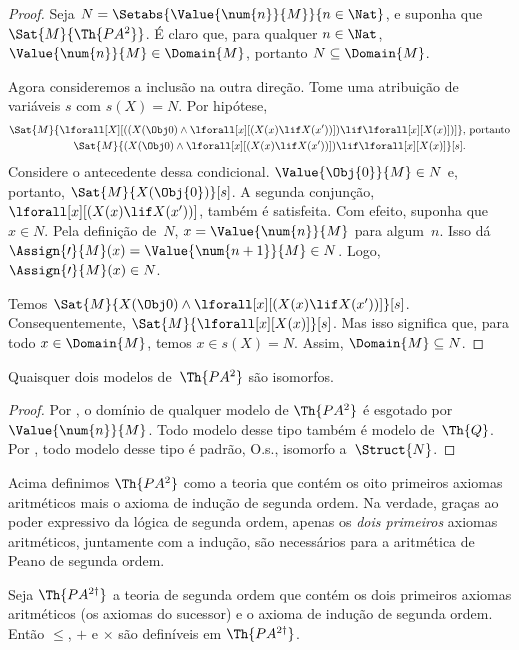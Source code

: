 \documentclass[../../../include/open-logic-section]{subfiles}
\begin{document}
\begin{proof}
Seja $N = \Setabs{\Value{\num{n}}{M}}{n \in \Nat}$, e suponha que
$\Sat{M}{\Th{PA^2}}$. É claro que, para qualquer $n \in \Nat$,
$\Value{\num{n}}{M} \in \Domain{M}$, portanto $N \subseteq \Domain{M}$.

Agora consideremos a inclusão na outra direção. Tome uma atribuição de
variáveis $s$ com $s(X) = N$. Por hipótese,
\begin{align*}
\Sat{M}{\lforall[X][((X(\Obj 0) \land \lforall[x][(X(x)
      \lif X(x'))]) \lif \lforall[x][X(x)])]}, & \text{ portanto}\\
\Sat{M}{(X(\Obj 0) \land \lforall[x][(X(x) \lif X(x'))]) \lif
  \lforall[x][X(x)]}[s]. & 
\end{align*}
Considere o antecedente dessa condicional. $\Value{\Obj{0}}{M} \in N$ e,
portanto, $\Sat{M}{X(\Obj{0})}[s]$. A segunda conjunção,
$\lforall[x][(X(x) \lif X(x'))]$, também é satisfeita. Com efeito, suponha
que $x \in N$. Pela definição de~$N$, $x = \Value{\num{n}}{M}$ para
algum~$n$. Isso dá $\Assign{\prime}{M}(x) = \Value{\num{n+1}}{M} \in N$.
Logo, $\Assign{\prime}{M}(x) \in N$.

Temos $\Sat{M}{X(\Obj 0) \land \lforall[x][(X(x) \lif X(x'))]}[s]$.
Consequentemente, $\Sat{M}{\lforall[x][X(x)]}[s]$. Mas isso significa que,
para todo $x \in \Domain{M}$, temos $x \in s(X) = N$. Assim,
$\Domain{M} \subseteq N$.
\end{proof}

\begin{cor}
Quaisquer dois modelos de~$\Th{PA^2}$ são isomorfos.
\end{cor}

\begin{proof}
Por , o domínio de qualquer modelo de
$\Th{PA^2}$ é esgotado por $\Value{\num{n}}{M}$. Todo modelo desse tipo
também é modelo de~$\Th{Q}$. Por
, todo modelo desse tipo é padrão,
O.s.\@, isomorfo a~$\Struct{N}$.
\end{proof}

Acima definimos $\Th{PA^2}$ como a teoria que contém os oito primeiros
axiomas aritméticos mais o axioma de indução de segunda ordem. Na verdade,
graças ao poder expressivo da lógica de segunda ordem, apenas os
\emph{dois primeiros} axiomas aritméticos, juntamente com a indução, são
necessários para a aritmética de Peano de segunda ordem.

\begin{prop}
Seja $\Th{PA^{2\dagger}}$ a teoria de segunda ordem que contém os dois
primeiros axiomas aritméticos (os axiomas do sucessor) e o axioma de indução
de segunda ordem. Então $\le$, $+$ e $\times$ são definíveis em
$\Th{PA^{2\dagger}}$.
\end{prop}
\end{document}
